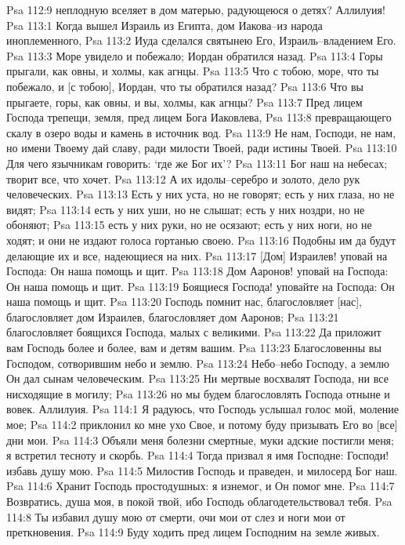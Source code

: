 Psa 112:9  неплодную вселяет в дом матерью, радующеюся о детях? Аллилуия!
Psa 113:1  Когда вышел Израиль из Египта, дом Иакова--из народа иноплеменного,
Psa 113:2  Иуда сделался святынею Его, Израиль--владением Его.
Psa 113:3  Море увидело и побежало; Иордан обратился назад.
Psa 113:4  Горы прыгали, как овны, и холмы, как агнцы.
Psa 113:5  Что с тобою, море, что ты побежало, и [с тобою], Иордан, что ты обратился назад?
Psa 113:6  Что вы прыгаете, горы, как овны, и вы, холмы, как агнцы?
Psa 113:7  Пред лицем Господа трепещи, земля, пред лицем Бога Иаковлева,
Psa 113:8  превращающего скалу в озеро воды и камень в источник вод.
Psa 113:9  Не нам, Господи, не нам, но имени Твоему дай славу, ради милости Твоей, ради истины Твоей.
Psa 113:10  Для чего язычникам говорить: `где же Бог их'?
Psa 113:11  Бог наш на небесах; творит все, что хочет.
Psa 113:12  А их идолы--серебро и золото, дело рук человеческих.
Psa 113:13  Есть у них уста, но не говорят; есть у них глаза, но не видят;
Psa 113:14  есть у них уши, но не слышат; есть у них ноздри, но не обоняют;
Psa 113:15  есть у них руки, но не осязают; есть у них ноги, но не ходят; и они не издают голоса гортанью своею.
Psa 113:16  Подобны им да будут делающие их и все, надеющиеся на них.
Psa 113:17  [Дом] Израилев! уповай на Господа: Он наша помощь и щит.
Psa 113:18  Дом Ааронов! уповай на Господа: Он наша помощь и щит.
Psa 113:19  Боящиеся Господа! уповайте на Господа: Он наша помощь и щит.
Psa 113:20  Господь помнит нас, благословляет [нас], благословляет дом Израилев, благословляет дом Ааронов;
Psa 113:21  благословляет боящихся Господа, малых с великими.
Psa 113:22  Да приложит вам Господь более и более, вам и детям вашим.
Psa 113:23  Благословенны вы Господом, сотворившим небо и землю.
Psa 113:24  Небо--небо Господу, а землю Он дал сынам человеческим.
Psa 113:25  Ни мертвые восхвалят Господа, ни все нисходящие в могилу;
Psa 113:26  но мы будем благословлять Господа отныне и вовек. Аллилуия.
Psa 114:1  Я радуюсь, что Господь услышал голос мой, моление мое;
Psa 114:2  приклонил ко мне ухо Свое, и потому буду призывать Его во [все] дни мои.
Psa 114:3  Объяли меня болезни смертные, муки адские постигли меня; я встретил тесноту и скорбь.
Psa 114:4  Тогда призвал я имя Господне: Господи! избавь душу мою.
Psa 114:5  Милостив Господь и праведен, и милосерд Бог наш.
Psa 114:6  Хранит Господь простодушных: я изнемог, и Он помог мне.
Psa 114:7  Возвратись, душа моя, в покой твой, ибо Господь облагодетельствовал тебя.
Psa 114:8  Ты избавил душу мою от смерти, очи мои от слез и ноги мои от преткновения.
Psa 114:9  Буду ходить пред лицем Господним на земле живых.
